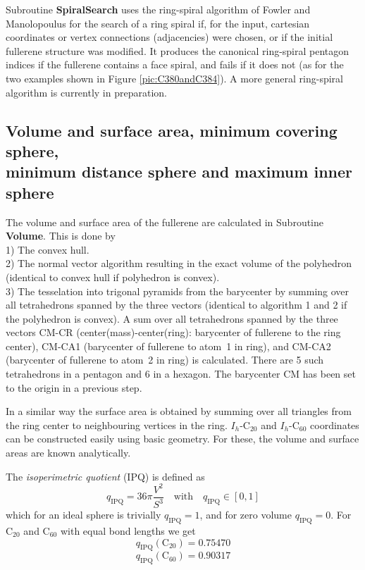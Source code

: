 \documentclass[article,a4paper,twoside]{memoir}
\newcommand{\C}[1]{\ensuremath{\mathrm{C}_{#1}}}
\newcommand{\funname}[1]{{\color{blue}\textbf{#1}}}
\begin{document}
Subroutine \funname{SpiralSearch} uses the ring-spiral algorithm of Fowler and Manolopoulus \cite{Atlas}
for the search of a ring spiral if, for the input, cartesian coordinates or vertex connections (adjacencies) were chosen, or if the
initial fullerene structure was modified. It produces the canonical ring-spiral pentagon indices
if the fullerene contains a face spiral, and fails if it does not (as for the two examples shown in 
Figure \ref{pic:C380andC384}).  A more general ring-spiral algorithm is currently in preparation.

\subsection{Volume and surface area, minimum covering sphere, \\ minimum distance sphere and maximum inner sphere}
The volume and surface area of the fullerene are calculated in Subroutine \funname{Volume}. This is done by\\
1) The convex hull.\\
2) The normal vector algorithm resulting in the exact volume of the polyhedron (identical to convex hull if polyhedron is convex).\\
3) The tesselation into trigonal pyramids from the barycenter by summing over all tetrahedrons spanned
by the three vectors (identical to algorithm 1 and 2 if the polyhedron is convex).  A sum over all
tetrahedrons spanned by the three vectors CM-CR (center(mass)-center(ring): barycenter of fullerene to the ring center),
CM-CA1 (barycenter of fullerene to atom~1 in ring), and CM-CA2 (barycenter of fullerene  to atom~2 in ring) is calculated.
There are 5 such tetrahedrons in a pentagon and 6 in a hexagon.  The barycenter CM has been set to the origin in a previous step.

In a similar way the surface area is obtained by summing over all triangles from the ring center to
neighbouring vertices in the ring. $I_h$-\C{20} and $I_h$-\C{60} coordinates can be constructed easily
using basic geometry. For these, the volume and surface areas are known analytically.

The \textit{isoperimetric quotient} (IPQ) is defined as
\begin{equation}
 q_{\textrm{IPQ}} =36\pi \frac{V^{2} }{S^{3}}\quad\text{with}\quad q_{\textrm{IPQ}}\in [0,1]
 \label{IPQ}
 \end{equation}
which for an ideal sphere is trivially $q_{\textrm{IPQ}}=1$, and for zero volume $q_{\textrm{IPQ}}=0$. For \C{20} 
and \C{60} with equal bond lengths we get
\begin{equation}
\label{IPQC20}
q_{\textrm{IPQ}} (\C{20}) =0.75470 
\end{equation} 
\begin{equation}
\label{IPQC60}
q_{\textrm{IPQ}} (\C{60}) =0.90317 
\end{equation} 
\end{document}
